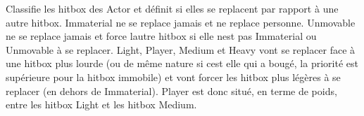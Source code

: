 Classifie les hitbox des Actor et définit si elles se replacent par rapport à une autre hitbox. Immaterial ne se replace jamais et ne replace personne. Unmovable ne se replace jamais et force l\textquotesingle{}autre hitbox si elle n\textquotesingle{}est pas Immaterial ou Unmovable à se replacer. Light, Player, Medium et Heavy vont se replacer face à une hitbox plus lourde (ou de même nature si c\textquotesingle{}est elle qui a bougé, la priorité est supérieure pour la hitbox immobile) et vont forcer les hitbox plus légères à se replacer (en dehors de Immaterial). Player est donc situé, en terme de poids, entre les hitbox Light et les hitbox Medium. 

